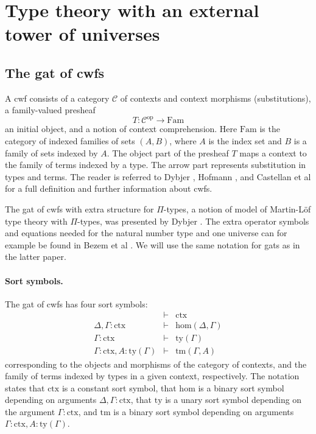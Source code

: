 \documentclass[11pt,a4paper]{article}
\theoremstyle{plain}
\theoremstyle{definition}
\newcommand{\op}{\mathrm{op}}
\def\sub{\mathrm{hom}}
\newcommand{\ctx}{\mathrm{ctx}}
\newcommand{\ty}{\mathrm{ty}}
\newcommand{\tm}{\mathrm{tm}}
\def\Fam{\mathrm{Fam}}
\def\C{\mathcal{C}}
\begin{document}
\section{Type theory with an external tower of universes}\label{sigmaext}

\subsection{The gat of cwfs} A cwf consists of a category $\C$ of contexts and context morphisms (substitutions), a family-valued presheaf
$$
T : \C^\op \to \Fam
$$
an initial object, and a notion of context comprehension. Here $\Fam$ is the category of indexed families of sets $(A,B)$, where $A$ is the index set and $B$ is a family of sets indexed by $A$. The object part of the presheaf $T$ maps a context to the family of terms indexed by a type. The arrow part represents substitution in types and terms. The reader is referred to Dybjer \cite{dybjer:torino}, Hofmann \cite{hofmann:cambridge}, and Castellan et al \cite{castellan:lambek} for a full definition and further information about cwfs.

The gat of cwfs with extra structure for $\Pi$-types, a notion of model of Martin-Löf type theory with $\Pi$-types, was presented by Dybjer \cite{dybjer:torino}. The extra operator symbols and equations needed for the natural number type and one universe can for example be found in Bezem et al \cite{bezem:hofmann}. We will use the same notation for gats as in the latter paper.


\paragraph{Sort symbols.}
The gat of cwfs has four sort symbols:
\begin{eqnarray*}
&\vdash& \ctx\\
\Delta, \Gamma : \ctx&\vdash& \sub(\Delta,\Gamma)\\
\Gamma : \ctx&\vdash& \ty(\Gamma)\\
\Gamma : \ctx, A : \ty(\Gamma)&\vdash& \tm(\Gamma,A)
\end{eqnarray*}
corresponding to the objects and morphisms of the category of contexts, and the family of terms indexed by types in a given context, respectively. The notation states that $\ctx$ is a constant sort symbol, that $\sub$ is a binary sort symbol depending on arguments $\Delta, \Gamma : \ctx$, that $\ty$ is a unary sort symbol depending on the argument $\Gamma : \ctx$, and $\tm$ is a binary sort symbol depending on arguments $\Gamma : \ctx, A : \ty(\Gamma)$.
\end{document}
